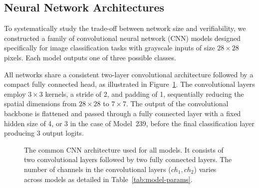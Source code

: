 \subsection{Neural Network Architectures}
\label{sec:nn-architectures}

To systematically study the trade-off between network size and verifiability, we constructed a family of convolutional neural network (CNN) models designed specifically for image classification tasks with grayscale inputs of size $28 \times 28$ pixels. Each model outputs one of three possible classes.

All networks share a consistent two-layer convolutional architecture followed by a compact fully connected head, as illustrated in Figure~\ref{fig:cnn-arch}. The convolutional layers employ $3 \times 3$ kernels, a stride of 2, and padding of 1, sequentially reducing the spatial dimensions from $28 \times 28$ to $7 \times 7$. The output of the convolutional backbone is flattened and passed through a fully connected layer with a fixed hidden size of 4, or 3 in the case of Model~239, before the final classification layer producing 3 output logits.



\begin{figure}[ht]
\centering
{}
\caption{The common CNN architecture used for all models. It consists of two convolutional layers followed by two fully connected layers. The number of channels in the convolutional layers ($ch_1, ch_2$) varies across models as detailed in Table~\ref{tab:model-params}.}
\label{fig:cnn-arch}
\end{figure}

